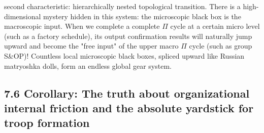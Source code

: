 \documentclass[11pt,a4paper]{article}
\begin{document}
second characteristic: hierarchically nested topological transition. There is a high-dimensional mystery hidden in this system: the microscopic black box is the macroscopic input. When we complete a complete $\Pi$ cycle at a certain micro level (such as a factory schedule), its output confirmation results will naturally jump upward and become the "free input" of the upper macro $\Pi$ cycle (such as group S\&OP)! Countless local microscopic black boxes, spliced upward like Russian matryoshka dolls, form an endless global gear system.


\subsection*{7.6 Corollary: The truth about organizational internal friction and the absolute yardstick for troop formation}
\end{document}
